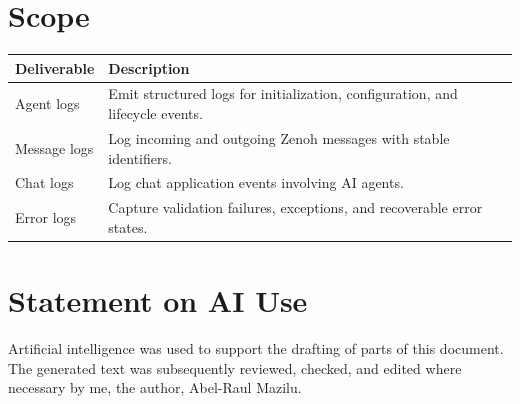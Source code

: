 \documentclass[11pt]{article}
\begin{document}
\section{Scope}

\begin{table}[ht]
\centering
\renewcommand{\arraystretch}{1.25}
\begin{tabular}{L{0.32\textwidth} L{0.58\textwidth}}
\toprule
\textbf{Deliverable} & \textbf{Description} \\
\midrule
Agent logs & Emit structured logs for initialization, configuration, and lifecycle events. \\
Message logs & Log incoming and outgoing Zenoh messages with stable identifiers. \\
Chat logs & Log chat application events involving AI agents. \\
Error logs & Capture validation failures, exceptions, and recoverable error states. \\
\bottomrule
\end{tabular}
\end{table}

\newpage

\section*{Statement on AI Use}

Artificial intelligence was used to support the drafting of parts of this document. The generated text was subsequently reviewed, checked, and edited where necessary by me, the author, Abel-Raul Mazilu.
\end{document}
